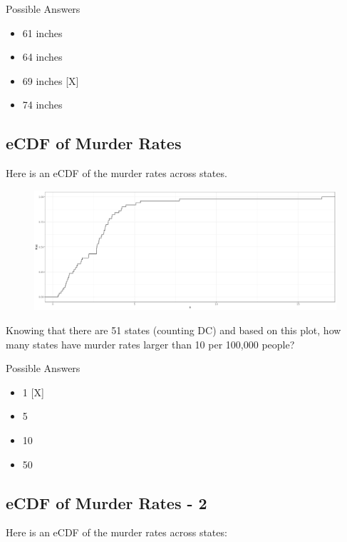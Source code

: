\documentclass[]{article}
\providecommand{\tightlist}{%
  \setlength{\itemsep}{0pt}\setlength{\parskip}{0pt}}
\begin{document}
Possible Answers

\begin{itemize}
\tightlist
\item
  61 inches
\item
  64 inches
\item
  69 inches {[}X{]}
\item
  74 inches
\end{itemize}

\subsection{\texorpdfstring{\textbf{eCDF of Murder
Rates}}{eCDF of Murder Rates}}\label{ecdf-of-murder-rates}

Here is an eCDF of the murder rates across states.

\begin{figure}
\centering
\includegraphics{img3.png}
\caption{}
\end{figure}

Knowing that there are 51 states (counting DC) and based on this plot,
how many states have murder rates larger than 10 per 100,000 people?

Possible Answers

\begin{itemize}
\tightlist
\item
  1 {[}X{]}
\item
  5
\item
  10
\item
  50
\end{itemize}

\subsection{\texorpdfstring{\textbf{eCDF of Murder Rates -
2}}{eCDF of Murder Rates - 2}}\label{ecdf-of-murder-rates---2}

Here is an eCDF of the murder rates across states:
\end{document}
